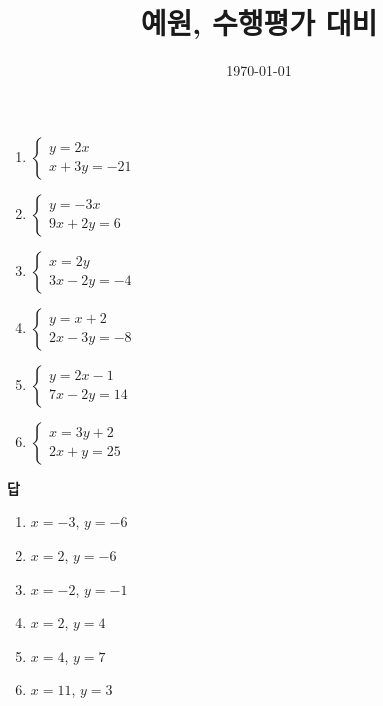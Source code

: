 \documentclass{article}
\title{예원, 수행평가 대비}
\date{\today}
\author{}
\begin{document}
\maketitle

\section{}

\begin{enumerate}[label=(\arabic*), itemsep=50pt]
    \item
    \(\begin{cases}
        y=2x\\
        x+3y=-21
    \end{cases}\)
    \item
    \(\begin{cases}
        y=-3x\\
        9x+2y=6
    \end{cases}\)
    \item
    \(\begin{cases}
        x=2y\\
        3x-2y=-4
    \end{cases}\)
    \item
    \(\begin{cases}
        y=x+2\\
        2x-3y=-8
    \end{cases}\)
    \item
    \(\begin{cases}
        y=2x-1\\
        7x-2y=14
    \end{cases}\)
    \item
    \(\begin{cases}
        x=3y+2\\
        2x+y=25
    \end{cases}\)
\end{enumerate}

\vspace*{\fill}
\noindent\textbf{답}
\begin{enumerate}[label=(\arabic*)]
    \item \(x=-3\), \(y=-6\)
    \item \(x=2\), \(y=-6\)
    \item \(x=-2\), \(y=-1\)
    \item \(x=2\), \(y=4\)
    \item \(x=4\), \(y=7\)
    \item \(x=11\), \(y=3\)
\end{enumerate}
\end{document}
